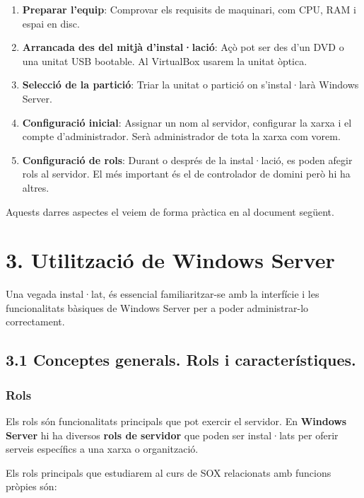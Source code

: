 \documentclass[
  a4paper,
]{article}
\providecommand{\tightlist}{%
  \setlength{\itemsep}{0pt}\setlength{\parskip}{0pt}}
\begin{document}
\begin{enumerate}
\def\labelenumi{\arabic{enumi}.}
\tightlist
\item
  \textbf{Preparar l'equip}: Comprovar els requisits de maquinari, com
  CPU, RAM i espai en disc.
\item
  \textbf{Arrancada des del mitjà d'instal·lació}: Açò pot ser des d'un
  DVD o una unitat USB bootable. Al VirtualBox usarem la unitat òptica.
\item
  \textbf{Selecció de la partició}: Triar la unitat o partició on
  s'instal·larà Windows Server.
\item
  \textbf{Configuració inicial}: Assignar un nom al servidor, configurar
  la xarxa i el compte d'administrador. Serà administrador de tota la
  xarxa com vorem.
\item
  \textbf{Configuració de rols}: Durant o després de la instal·lació, es
  poden afegir rols al servidor. El més important és el de controlador
  de domini però hi ha altres.
\end{enumerate}

Aquests darres aspectes el veiem de forma pràctica en al document
següent.

\section{3. Utilització de Windows
Server}\label{utilitzaciuxf3-de-windows-server}

Una vegada instal·lat, és essencial familiaritzar-se amb la interfície i
les funcionalitats bàsiques de Windows Server per a poder administrar-lo
correctament.

\subsection{3.1 Conceptes generals. Rols i
característiques.}\label{conceptes-generals.-rols-i-caracteruxedstiques.}

\subsubsection{Rols}\label{rols}

Els rols són funcionalitats principals que pot exercir el servidor. En
\textbf{Windows Server} hi ha diversos \textbf{rols de servidor} que
poden ser instal·lats per oferir serveis específics a una xarxa o
organització.

Els rols principals que estudiarem al curs de SOX relacionats amb
funcions pròpies són:
\end{document}
